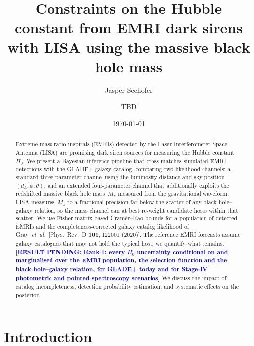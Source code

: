 \documentclass[aps,prd,twocolumn,superscriptaddress,nofootinbib]{revtex4-2}
\newcommand{\HH}{H_0}
\newcommand{\dL}{d_L}
\newcommand{\Mz}{M_z}
\newcommand{\pending}[1]{\textcolor{blue}{\textbf{[RESULT PENDING: #1]}}}
\begin{document}
\title{Constraints on the Hubble constant from EMRI dark sirens with LISA using the massive black hole mass}

\author{Jasper Seehofer}

\author{TBD}

\date{\today}

\begin{abstract}
Extreme mass ratio inspirals (EMRIs) detected by the Laser Interferometer
Space Antenna (LISA) are promising dark siren sources for measuring the
Hubble constant~$\HH$.  We present a Bayesian inference pipeline that
cross-matches simulated EMRI detections with the GLADE+ galaxy catalog,
comparing two likelihood channels: a standard three-parameter channel using
the luminosity distance and sky position~$(\dL, \phi, \theta)$, and an
extended four-parameter channel that additionally exploits the redshifted
massive black hole mass~$\Mz$ measured from the gravitational waveform.
LISA measures~$\Mz$ to a fractional precision far below the scatter of
any black-hole--galaxy relation, so the mass channel can at best
re-weight candidate hosts within that scatter.
We use Fisher-matrix-based Cram\'er--Rao bounds for a population of
detected EMRIs and the completeness-corrected galaxy catalog likelihood of
Gray~\textit{et~al.}\ [Phys.\ Rev.\ D \textbf{101}, 122001 (2020)].
The reference EMRI forecasts assume galaxy catalogues that may not hold
the typical host; we quantify what remains.
\pending{Rank-1: every $\HH$ uncertainty conditional on and marginalised
over the EMRI population, the selection function and the
black-hole--galaxy relation, for GLADE+ today and for Stage-IV
photometric and pointed-spectroscopy scenarios}
We discuss the impact of catalog
incompleteness, detection probability estimation, and systematic
effects on the posterior.
\end{abstract}

\maketitle

\section{Introduction}
\label{sec:intro}
\end{document}
